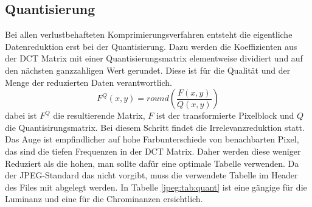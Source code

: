 \subsection{Quantisierung
\label{jpeg:subsection:quantisierung}}
Bei allen verlustbehafteten Komprimierungsverfahren entsteht die eigentliche Datenreduktion erst bei der Quantisierung.
Dazu werden die Koeffizienten aus der DCT Matrix mit einer Quantisierungsmatrix elementweise dividiert und auf den nächsten ganzzahligen Wert gerundet.
Diese ist für die Qualität und der Menge der reduzierten Daten verantwortlich.
\begin{equation}
    F^Q(x,y)
    =
    round \left(
    \frac{F(x,y)}{Q(x,y)}
    \right)
\end{equation}
dabei ist \(F^Q\) die resultierende Matrix, \(F\) ist der transformierte Pixelblock und \(Q\) die Quantisirungsmatrix.
Bei diesem Schritt findet die Irrelevanzreduktion statt.
Das Auge ist empfindlicher auf hohe Farbunterschiede von benachbarten Pixel, das sind die tiefen Frequenzen in der DCT Matrix.
Daher werden diese weniger Reduziert als die hohen, man sollte dafür eine optimale Tabelle verwenden.
Da der JPEG-Standard das nicht vorgibt, muss die verwendete Tabelle im Header des Files mit abgelegt werden.
In Tabelle \ref{jpeg:tab:quant} ist eine gängige für die Luminanz und eine für die Chrominanzen ersichtlich.

